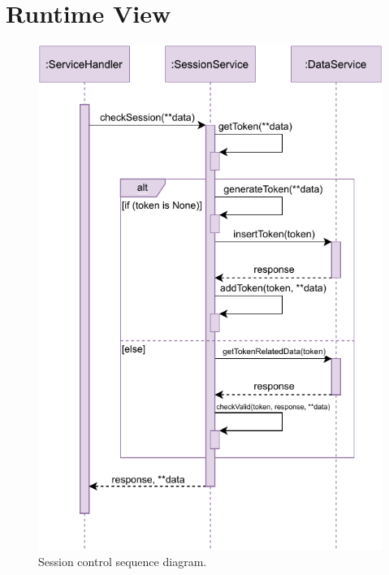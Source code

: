 \section{Runtime View}

\begin{figure}[H]
	\centering
	\includegraphics[width=1.0\textwidth]{images/sessionToken_sequence_diagram.pdf}
	\caption{Session control sequence diagram.}
\end{figure}

